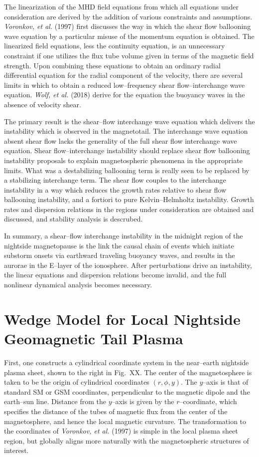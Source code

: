 \documentclass[a4paper,openany,12pt]{book}
\begin{document}
The linearization of the MHD field equations from which all equations under consideration are derived by the addition of various constraints and assumptions. 
\emph{Voronkov, et al.} (1997) first discusses the way in which the shear flow ballooning wave equation by a particular misuse of the momentum equation is obtained. The linearized field equations, less the continuity equation, is an unnecessary constraint if one utilizes the flux tube volume given in terms of the magnetic field strength. Upon combining these equations to obtain an ordinary radial differential equation for the radial component of the velocity, there are several limits in which to obtain a reduced low--frequency shear flow--interchange wave equation.  \emph{Wolf, et al.} (2018) derive for the equation the buoyancy waves in the absence of velocity shear.

The primary result is the shear--flow interchange wave equation which delivers the instability which is observed in the magnetotail. The interchange wave equation absent shear flow lacks the generality of the full shear flow interchange wave equation. Shear flow--interchange instability should replace shear flow ballooning instability proposals to explain magnetospheric phenomena in the appropriate limits. What was a destabilizing ballooning term is really seen to be replaced by a stabilizing interchange term. The shear flow couples to the interchange instability in a way which reduces the growth rates relative to shear flow ballooning instability, and a fortiori to pure Kelvin--Helmholtz instability. Growth rates and dispersion relations in the regions under consideration are obtained and discussed, and stability analysis is descrubed.

In summary, a shear--flow interchange instability in the midnight region of the nightside magnetopause is the link the causal chain of events which initiate substorm onsets via earthward traveling buoyancy waves, and results in the aurorae in the E--layer of the ionosphere. After perturbations drive an instability, the linear equations and dispersion relations become invalid, and the full nonlinear dynamical analysis becomes necessary. 

\section{Wedge Model for Local Nightside Geomagnetic Tail Plasma}

First, one constructs a cylindrical coordinate system in the near--earth nightside plasma sheet, shown to the right in Fig.~XX. The center of the magnetosphere is taken to be the origin of cylindrical coordinates $(r, \phi, y)$. The $y$--axis is that of standard SM or GSM coordinates, perpendicular to the magnetic dipole and the earth--sun line. Distance from the $y$--axis is given by the $r$--coordinate, which specifies the distance of the tubes of magnetic flux from the center of the magnetosphere, and hence the local magnetic curvature. The transformation to the coordinates of \emph{Voronkov, et al.} (1997) is simple in the local plasma sheet region, but globally aligns more naturally with the magnetospheric structures of interest.
\end{document}
